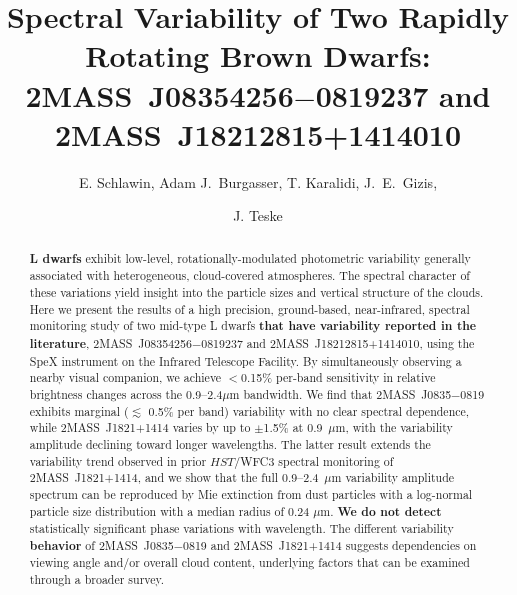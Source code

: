 \documentclass[twocolumn]{aastex6}
\begin{document}
\title{Spectral Variability of Two Rapidly Rotating Brown Dwarfs: \\2MASS~J08354256$-$0819237 and 2MASS~J18212815+1414010}


\author{E. Schlawin, Adam J.\ Burgasser, T. Karalidi, J.\ E.\  Gizis,  \and J. Teske}


\begin{abstract}
\textbf{L dwarfs} exhibit low-level, rotationally-modulated photometric variability generally associated with heterogeneous, cloud-covered atmospheres. The spectral character of these variations yield insight into the particle sizes and vertical structure of the clouds. Here we present the results of a high precision, ground-based, near-infrared, spectral monitoring study of two mid-type L dwarfs \textbf{that have variability reported in the literature}, 2MASS~J08354256$-$0819237 and 2MASS~J18212815+1414010, using the SpeX instrument on the Infrared Telescope Facility. By simultaneously observing a nearby visual companion, we achieve $<$0.15\% per-band sensitivity in relative brightness changes across the 0.9--2.4$\mu$m bandwidth. We find that 2MASS~J0835$-$0819 exhibits marginal ($\lesssim$ 0.5\% per band) variability with no clear spectral dependence, while 2MASS~J1821+1414 varies by up to $\pm$1.5\% at 0.9~$\mu$m, with the variability amplitude declining toward longer wavelengths. The latter result extends the variability trend observed in prior $HST$/WFC3 spectral monitoring of 2MASS~J1821+1414, and we show that the full 0.9--2.4~$\mu$m variability amplitude spectrum can be reproduced by Mie extinction from dust particles with a log-normal particle size distribution with a median radius of 0.24 $\mu$m. \textbf{We do not detect} statistically significant phase variations with wavelength. The different variability \textbf{behavior} of 2MASS~J0835$-$0819 and  2MASS~J1821+1414 suggests dependencies on viewing angle and/or overall cloud content, underlying factors that can be examined through a broader survey.
\end{abstract}
\end{document}
